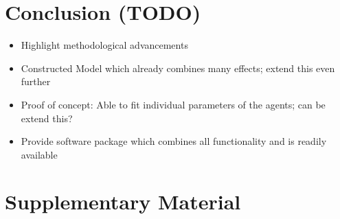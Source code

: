 \documentclass{article}
\begin{document}
\section{Conclusion (TODO)}
\label{section:conclusion}

\begin{itemize}
    \item Highlight methodological advancements
    \item Constructed Model which already combines many effects; extend this even further
    \item Proof of concept: Able to fit individual parameters of the agents; can be extend this?
    \item Provide software package which combines all functionality and is readily available
\end{itemize}

% 




\appendix
\section*{Supplementary Material}

\renewcommand{\thesection}{S\arabic{section}}

\end{document}
